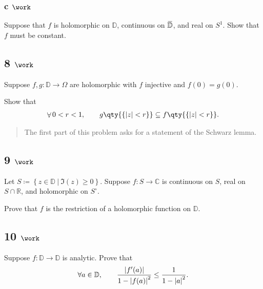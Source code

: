 \hypertarget{c-work-1}{%
\subsubsection{\texorpdfstring{c
\(\work\)}{c \textbackslash work}}\label{c-work-1}}

Suppose that \(f\) is holomorphic on \({\mathbb{D}}\), continuous on
\(\mkern 1.5mu\overline{\mkern-1.5mu{\mathbb{D}}\mkern-1.5mu}\mkern 1.5mu\),
and real on \(S^1\). Show that \(f\) must be constant.

\hypertarget{work-77}{%
\subsection{\texorpdfstring{8
\(\work\)}{8 \textbackslash work}}\label{work-77}}

Suppose \(f, g: {\mathbb{D}}\to \Omega\) are holomorphic with \(f\)
injective and \(f(0) = g(0)\).

Show that
\begin{align*}  
\mathop{\mathrm{\forall}}0 < r < 1,\qquad g\qty{\left\{{{\left\lvert {z} \right\rvert} < r}\right\}} \subseteq f\qty{\left\{{{\left\lvert {z} \right\rvert} < r}\right\}}
.\end{align*}

\begin{quote}
The first part of this problem asks for a statement of the Schwarz
lemma.
\end{quote}

\hypertarget{work-78}{%
\subsection{\texorpdfstring{9
\(\work\)}{9 \textbackslash work}}\label{work-78}}

Let
\(S\coloneqq\left\{{z\in {\mathbb{D}}{~\mathrel{\Big|}~}\Im(z) \geq 0}\right\}\).
Suppose \(f:S\to {\mathbb{C}}\) is continuous on \(S\), real on
\(S\cap{\mathbb{R}}\), and holomorphic on \(S^\circ\).

Prove that \(f\) is the restriction of a holomorphic function on
\({\mathbb{D}}\).

\hypertarget{work-79}{%
\subsection{\texorpdfstring{10
\(\work\)}{10 \textbackslash work}}\label{work-79}}

Suppose \(f:{\mathbb{D}}\to {\mathbb{D}}\) is analytic. Prove that
\begin{align*}  
\forall a\in {\mathbb{D}}, \qquad {{\left\lvert {f'(a)} \right\rvert} \over 1 - {\left\lvert {f(a)} \right\rvert}^2 } \leq {1 \over 1 - {\left\lvert {a} \right\rvert}^2}
.\end{align*}

